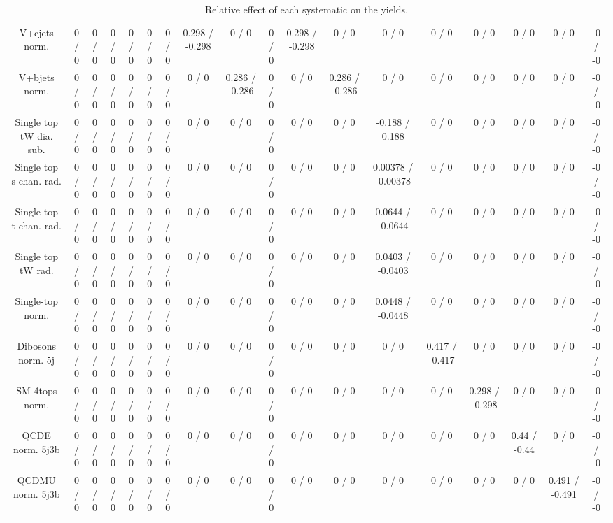 \documentclass[10pt]{article}
\begin{document}
\begin{table}[htbp]
\begin{center}
\begin{tabular}{|c|c|c|c|c|c|c|c|c|c|c|c|c|c|c|c|c|c|}
  V+cjets norm. & 0 / 0 & 0 / 0 & 0 / 0 & 0 / 0 & 0 / 0 & 0 / 0 & 0.298 / -0.298 & 0 / 0 & 0 / 0 & 0.298 / -0.298 & 0 / 0 & 0 / 0 & 0 / 0 & 0 / 0 & 0 / 0 & 0 / 0 & -0 / -0 \\ 
  V+bjets norm. & 0 / 0 & 0 / 0 & 0 / 0 & 0 / 0 & 0 / 0 & 0 / 0 & 0 / 0 & 0.286 / -0.286 & 0 / 0 & 0 / 0 & 0.286 / -0.286 & 0 / 0 & 0 / 0 & 0 / 0 & 0 / 0 & 0 / 0 & -0 / -0 \\ 
  Single top tW dia. sub. & 0 / 0 & 0 / 0 & 0 / 0 & 0 / 0 & 0 / 0 & 0 / 0 & 0 / 0 & 0 / 0 & 0 / 0 & 0 / 0 & 0 / 0 & -0.188 / 0.188 & 0 / 0 & 0 / 0 & 0 / 0 & 0 / 0 & -0 / -0 \\ 
  Single top s-chan. rad. & 0 / 0 & 0 / 0 & 0 / 0 & 0 / 0 & 0 / 0 & 0 / 0 & 0 / 0 & 0 / 0 & 0 / 0 & 0 / 0 & 0 / 0 & 0.00378 / -0.00378 & 0 / 0 & 0 / 0 & 0 / 0 & 0 / 0 & -0 / -0 \\ 
  Single top t-chan. rad. & 0 / 0 & 0 / 0 & 0 / 0 & 0 / 0 & 0 / 0 & 0 / 0 & 0 / 0 & 0 / 0 & 0 / 0 & 0 / 0 & 0 / 0 & 0.0644 / -0.0644 & 0 / 0 & 0 / 0 & 0 / 0 & 0 / 0 & -0 / -0 \\ 
  Single top tW rad. & 0 / 0 & 0 / 0 & 0 / 0 & 0 / 0 & 0 / 0 & 0 / 0 & 0 / 0 & 0 / 0 & 0 / 0 & 0 / 0 & 0 / 0 & 0.0403 / -0.0403 & 0 / 0 & 0 / 0 & 0 / 0 & 0 / 0 & -0 / -0 \\ 
  Single-top norm. & 0 / 0 & 0 / 0 & 0 / 0 & 0 / 0 & 0 / 0 & 0 / 0 & 0 / 0 & 0 / 0 & 0 / 0 & 0 / 0 & 0 / 0 & 0.0448 / -0.0448 & 0 / 0 & 0 / 0 & 0 / 0 & 0 / 0 & -0 / -0 \\ 
  Dibosons norm. 5j & 0 / 0 & 0 / 0 & 0 / 0 & 0 / 0 & 0 / 0 & 0 / 0 & 0 / 0 & 0 / 0 & 0 / 0 & 0 / 0 & 0 / 0 & 0 / 0 & 0.417 / -0.417 & 0 / 0 & 0 / 0 & 0 / 0 & -0 / -0 \\ 
  SM 4tops norm. & 0 / 0 & 0 / 0 & 0 / 0 & 0 / 0 & 0 / 0 & 0 / 0 & 0 / 0 & 0 / 0 & 0 / 0 & 0 / 0 & 0 / 0 & 0 / 0 & 0 / 0 & 0.298 / -0.298 & 0 / 0 & 0 / 0 & -0 / -0 \\ 
  QCDE norm. 5j3b & 0 / 0 & 0 / 0 & 0 / 0 & 0 / 0 & 0 / 0 & 0 / 0 & 0 / 0 & 0 / 0 & 0 / 0 & 0 / 0 & 0 / 0 & 0 / 0 & 0 / 0 & 0 / 0 & 0.44 / -0.44 & 0 / 0 & -0 / -0 \\ 
  QCDMU norm. 5j3b & 0 / 0 & 0 / 0 & 0 / 0 & 0 / 0 & 0 / 0 & 0 / 0 & 0 / 0 & 0 / 0 & 0 / 0 & 0 / 0 & 0 / 0 & 0 / 0 & 0 / 0 & 0 / 0 & 0 / 0 & 0.491 / -0.491 & -0 / -0 \\ 
\hline 
\end{tabular} 
\caption{Relative effect of each systematic on the yields.} 
\end{center} 
\end{table} 
\end{document}
